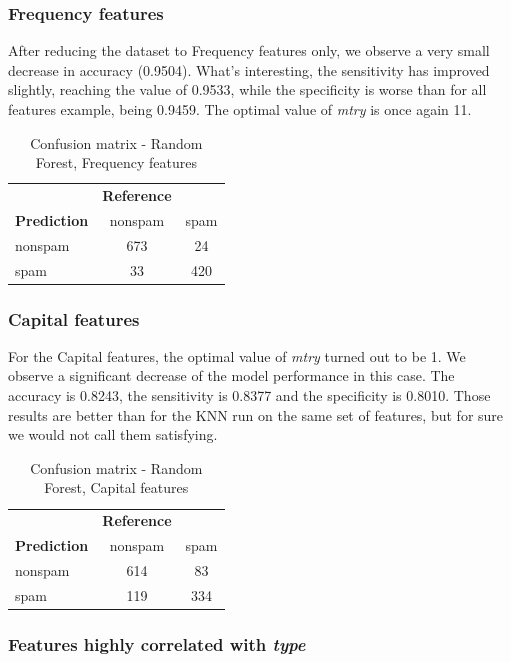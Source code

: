 \documentclass{article}\usepackage[]{graphicx}\usepackage[]{xcolor}
\begin{document}
\subsubsection*{Frequency features}

After reducing the dataset to Frequency features only, we observe a very small decrease
in accuracy (0.9504). What's interesting, the sensitivity has improved slightly,
reaching the value of 0.9533, while the specificity is worse than for all features example,
being 0.9459. The optimal value of \textit{mtry} is once again 11.

\begin{table}[h]
    \centering
    \begin{tabular}{lcc}
        & \textbf{Reference} & \\
        \textbf{Prediction} & nonspam & spam \\
        nonspam & 673 & 24 \\
        spam & 33 & 420 \\
    \end{tabular}
    \caption{Confusion matrix - Random Forest, Frequency features}
    \label{RFcm2}
\end{table}

\subsubsection*{Capital features}

For the Capital features, the optimal value of \textit{mtry} turned out to be 1.
We observe a significant decrease of the model performance in this case. The accuracy
is 0.8243, the sensitivity is 0.8377 and the specificity is 0.8010. Those results 
are better than for the KNN run on the same set of features, but for sure we would 
not call them satisfying.

\begin{table}[h]
    \centering
    \begin{tabular}{lcc}
        & \textbf{Reference} & \\
        \textbf{Prediction} & nonspam & spam \\
        nonspam & 614 & 83 \\
        spam & 119 & 334 \\
    \end{tabular}
    \caption{Confusion matrix - Random Forest, Capital features}
    \label{RFcm3}
\end{table}

\subsubsection*{Features highly correlated with \textit{type}}
\end{document}
